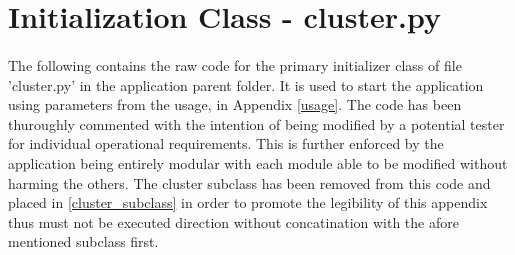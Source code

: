 \section{Initialization Class - cluster.py}
\label{cluster.py}
\paragraph{}The following contains the raw code for the primary initializer class of file  'cluster.py' in the application parent folder. It is used to start the application using parameters from the usage, in Appendix \ref{usage}.  The code has been thuroughly commented with the intention of being modified by a potential tester for individual operational requirements. This is further enforced by the application being entirely modular with each module able to be modified without harming the others. The cluster subclass has been removed from this code and placed in \ref{cluster_subclass} in order to promote the legibility of this appendix thus must not be executed direction without concatination with the afore mentioned subclass first.
